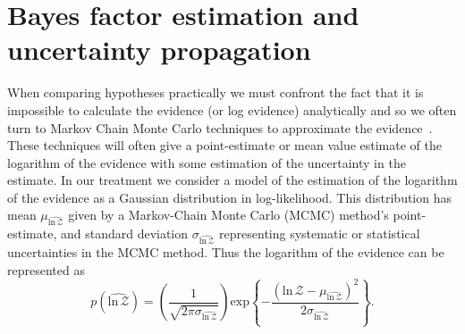 \section{Bayes factor estimation and uncertainty propagation}\label{sec:practical_bayes}
When comparing hypotheses practically we must confront the fact that it is impossible to calculate the evidence (or log evidence) analytically and so we often turn to Markov Chain Monte Carlo techniques to approximate the evidence~\cite{hobson2010bayesian}. These techniques will often give a point-estimate or mean value estimate of the logarithm of the evidence with some estimation of the uncertainty in the estimate. In our treatment we consider a model of the estimation of the logarithm of the evidence as a Gaussian distribution in log-likelihood. This distribution has mean $\mu_{\widehat{\mathrm{ln} \, \mathcal{Z}}}$ given by a Markov-Chain Monte Carlo (MCMC) method's point-estimate, and standard deviation $\sigma_{\widehat{\mathrm{ln} \, \mathcal{Z}}}$ representing systematic or statistical uncertainties in the MCMC method. Thus the logarithm of the evidence can be represented as 
\begin{equation}\label{eqn:p_log_z}
    p(\widehat{\mathrm{ln} \, \mathcal{Z}}) = \left(\frac{1}{\sqrt{2 \pi \sigma_{\widehat{\mathrm{ln} \, \mathcal{Z}}}}} \right) \mathrm{exp} \left \{-\frac{\left(\mathrm{ln} \, \mathcal{Z} - \mu_{\widehat{\mathrm{ln} \, \mathcal{Z}}}\right)^2} {2 \sigma_{\widehat{\mathrm{ln} \, \mathcal{Z}}}}  \right\}.
\end{equation}

